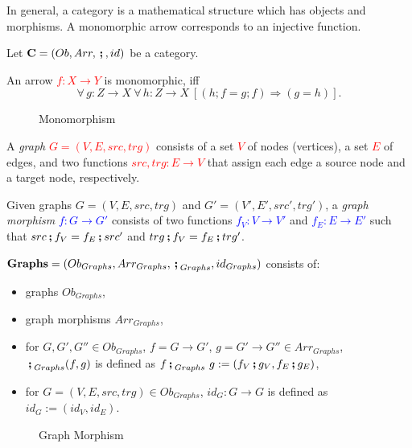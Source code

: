 \noindent
In general, a category is a mathematical structure which has objects and morphisms.
A monomorphic arrow corresponds to an injective function.

\begin{definition}[Monomorphism]
	\label{def:monomorphism}%
	Let $\mathbf{C} = (Ob, Arr, \textbf{\,;\,} , id)$ be a category.

	\gap
	An arrow \textcolor{red}{$f : X \rightarrow Y$} is monomorphic, iff 
	\[
		\forall\, g: Z \rightarrow X~ \forall\, h: Z \rightarrow X~ [(h;f = g;f) \Rightarrow (g = h)].
	\]
\end{definition}

\begin{figure}[h!]
	\centering
	
	\caption{Monomorphism}
	\label{fig:monomorphism}
\end{figure}

\begin{definition}
	\label{def:graphs}%
	A \emph{graph} \textcolor{red}{$G = (V, E, src, trg)$} consists of a set \textcolor{red}{$V$} of nodes (vertices), a set \textcolor{red}{$E$} of edges, and two functions \textcolor{red}{$src, trg: E \rightarrow V$} that assign each edge a source node and a target node, respectively.

	\gap
	Given graphs $G = (V, E,src,trg)$ and $G' = (V', E', src', trg')$, a \emph{graph morphism} \textcolor{blue}{$f: G \rightarrow G'$} consists of two functions
	\textcolor{blue}{$f_V: V \rightarrow V'$}
	and \textcolor{blue}{$f_E: E \rightarrow E'$}
	such that $src \textbf{\,;\,} f_V = f_E \textbf{\,;\,} src'$ and $trg \textbf{\,;\,} f_V  = f_E \textbf{\,;\,} trg'$.

	\gap
	$\textbf{Graphs} = (Ob_{Graphs}, Arr_{Graphs}, \textbf{\,;\,}_{Graphs}, id_{Graphs})$ consists of:
	\begin{itemize}
		\item graphs $Ob_{Graphs}$,
		\item graph morphisms $Arr_{Graphs}$,
		\item for $G, G', G'' \in Ob_{Graphs}$, $f =  G \rightarrow G'$, $g = G' \rightarrow G'' \in Arr_{Graphs}$, 
		$\textbf{\,;\,}_{Graphs} (f,g) $ is defined as $f \textbf{\,;\,}_{Graphs}~g := (f_V \textbf{\,;\,} g_V, f_E \textbf{\,;\,} g_E)$, 
		\item for $G = (V, E, src,trg) \in Ob_{Graphs}$,
		$id_G: G \rightarrow G$ is defined as $id_G := (id_V, id_E)$.
	\end{itemize}
\end{definition}

\begin{figure}[h!]
	\centering
	
	\caption{Graph Morphism}
	\label{fig:graph-morphism}
\end{figure}

